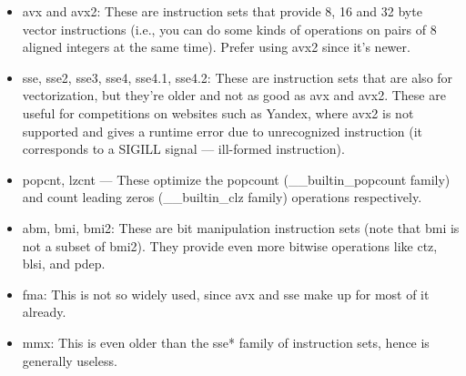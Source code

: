 		\begin{itemize}
    	\item avx and avx2: These are instruction sets that provide 8, 16 and 32 byte vector instructions (i.e., you can do some kinds of operations on pairs of 8 aligned integers at the same time). Prefer using avx2 since it's newer.
    	\item sse, sse2, sse3, sse4, sse4.1, sse4.2: These are instruction sets that are also for vectorization, but they're older and not as good as avx and avx2. These are useful for competitions on websites such as Yandex, where avx2 is not supported and gives a runtime error due to unrecognized instruction (it corresponds to a SIGILL signal — ill-formed instruction).
    	\item popcnt, lzcnt — These optimize the popcount (\_\_builtin\_popcount family) and count leading zeros (\_\_builtin\_clz family) operations respectively.
    	\item abm, bmi, bmi2: These are bit manipulation instruction sets (note that bmi is not a subset of bmi2). They provide even more bitwise operations like ctz, blsi, and pdep.
    	\item fma: This is not so widely used, since avx and sse make up for most of it already.
    	\item mmx: This is even older than the sse* family of instruction sets, hence is generally useless.

		\end{itemize}
